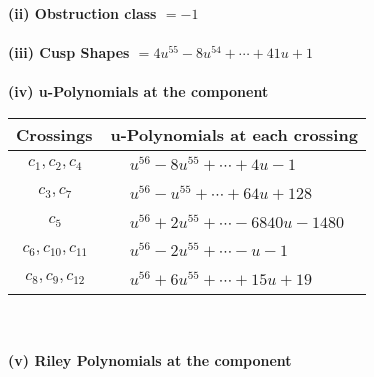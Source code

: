 \documentclass[1p]{elsarticle_modified}
\theoremstyle{definition}
\begin{document}
\flushleft \textbf{(ii) Obstruction class $= -1$}\\~\\
\flushleft \textbf{(iii) Cusp Shapes $= 4 u^{55}-8 u^{54}+\cdots+41 u+1$}\\~\\
\newpage\renewcommand{\arraystretch}{1}
\flushleft \textbf{(iv) u-Polynomials at the component}\newline \\
\begin{tabular}{m{50pt}|m{274pt}}
Crossings & \hspace{64pt}u-Polynomials at each crossing \\
\hline $$\begin{aligned}c_{1},c_{2},c_{4}\end{aligned}$$&$\begin{aligned}
&u^{56}-8 u^{55}+\cdots+4 u-1
\end{aligned}$\\
\hline $$\begin{aligned}c_{3},c_{7}\end{aligned}$$&$\begin{aligned}
&u^{56}- u^{55}+\cdots+64 u+128
\end{aligned}$\\
\hline $$\begin{aligned}c_{5}\end{aligned}$$&$\begin{aligned}
&u^{56}+2 u^{55}+\cdots-6840 u-1480
\end{aligned}$\\
\hline $$\begin{aligned}c_{6},c_{10},c_{11}\end{aligned}$$&$\begin{aligned}
&u^{56}-2 u^{55}+\cdots- u-1
\end{aligned}$\\
\hline $$\begin{aligned}c_{8},c_{9},c_{12}\end{aligned}$$&$\begin{aligned}
&u^{56}+6 u^{55}+\cdots+15 u+19
\end{aligned}$\\
\hline
\end{tabular}\\~\\
\newpage\renewcommand{\arraystretch}{1}
\flushleft \textbf{(v) Riley Polynomials at the component}\newline \\
\end{document}
